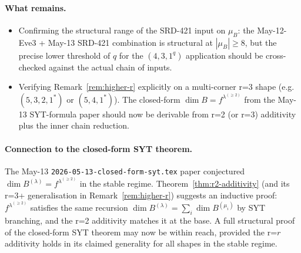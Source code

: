 \documentclass[11pt]{article}
\theoremstyle{definition}
\begin{document}
\paragraph{What remains.}
\begin{itemize}[leftmargin=2em,topsep=0.2em,itemsep=0.1em]
\item Confirming the structural range of the SRD-421 input on
$\mu_B$: the May-12-Eve3 + May-13 SRD-421 combination is structural at
$|\mu_B| \ge 8$, but the precise lower threshold of $q$ for the
$(4, 3, 1^q)$ application should be cross-checked against the actual
chain of inputs.
\item Verifying Remark~\ref{rem:higher-r} explicitly on a multi-corner
r=3 shape (e.g.\ $(5, 3, 2, 1^*)$ or $(5, 4, 1^*)$). The closed-form
$\dim B = f^{\lambda^{(\ge 2)}}$ from the May-13 SYT-formula paper
should now be derivable from r=2 (or r=3) additivity plus the inner
chain reduction.
\end{itemize}

\paragraph{Connection to the closed-form SYT theorem.}
The May-13 \texttt{2026-05-13-closed-form-syt.tex} paper conjectured
$\dim B^{(\lambda)} = f^{\lambda^{(\ge 2)}}$ in the stable regime.
Theorem~\ref{thm:r2-additivity} (and its r=3+ generalisation in
Remark~\ref{rem:higher-r}) suggests an inductive proof:
$f^{\lambda^{(\ge 2)}}$ satisfies the same recursion
$\dim B^{(\lambda)} = \sum_i \dim B^{(\mu_i)}$ by SYT branching, and
the r=2 additivity matches it at the base. A full structural proof of
the closed-form SYT theorem may now be within reach, provided the
r=$r$ additivity holds in its claimed generality for all shapes in
the stable regime.
\end{document}
